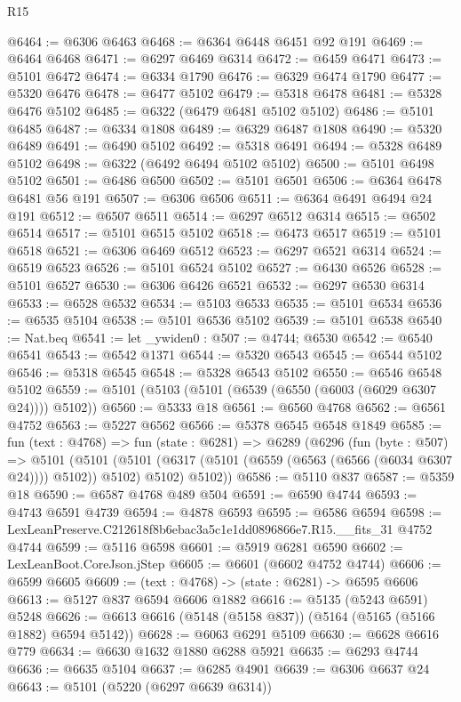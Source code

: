 \begin{lexlean}{R15}
\begin{coremodule}
{{{{{{{{{{{@6464 := @6306 @6463
@6468 := @6364 @6448 @6451 @92 @191
@6469 := @6464 @6468
@6471 := @6297 @6469 @6314
@6472 := @6459 @6471
@6473 := @5101 @6472
@6474 := @6334 @1790
@6476 := @6329 @6474 @1790
@6477 := @5320 @6476
@6478 := @6477 @5102
@6479 := @5318 @6478
@6481 := @5328 @6476 @5102
@6485 := @6322 (@6479 @6481 @5102 @5102)
@6486 := @5101 @6485
@6487 := @6334 @1808
@6489 := @6329 @6487 @1808
@6490 := @5320 @6489
@6491 := @6490 @5102
@6492 := @5318 @6491
@6494 := @5328 @6489 @5102
@6498 := @6322 (@6492 @6494 @5102 @5102)
@6500 := @5101 @6498 @5102
@6501 := @6486 @6500
@6502 := @5101 @6501
@6506 := @6364 @6478 @6481 @56 @191
@6507 := @6306 @6506
@6511 := @6364 @6491 @6494 @24 @191
@6512 := @6507 @6511
@6514 := @6297 @6512 @6314
@6515 := @6502 @6514
@6517 := @5101 @6515 @5102
@6518 := @6473 @6517
@6519 := @5101 @6518
@6521 := @6306 @6469 @6512
@6523 := @6297 @6521 @6314
@6524 := @6519 @6523
@6526 := @5101 @6524 @5102
@6527 := @6430 @6526
@6528 := @5101 @6527
@6530 := @6306 @6426 @6521
@6532 := @6297 @6530 @6314
@6533 := @6528 @6532
@6534 := @5103 @6533
@6535 := @5101 @6534
@6536 := @6535 @5104
@6538 := @5101 @6536 @5102
@6539 := @5101 @6538
@6540 := Nat.beq
@6541 := let _ywiden0 : @507 := @4744; @6530
@6542 := @6540 @6541
@6543 := @6542 @1371
@6544 := @5320 @6543
@6545 := @6544 @5102
@6546 := @5318 @6545
@6548 := @5328 @6543 @5102
@6550 := @6546 @6548 @5102
@6559 := @5101 (@5103 (@5101 (@6539 (@6550 (@6003 (@6029 @6307 @24)))) @5102))
@6560 := @5333 @18
@6561 := @6560 @4768
@6562 := @6561 @4752
@6563 := @5227 @6562
@6566 := @5378 @6545 @6548 @1849
@6585 := fun (text : @4768) =>
  fun (state : @6281) =>
  @6289
    (@6296
      (fun (byte : @507) =>
      @5101
        (@5101 (@5101 (@6317 (@5101 (@6559 (@6563 (@6566 (@6034 @6307 @24)))) @5102)) @5102) @5102)
        @5102))
@6586 := @5110 @837
@6587 := @5359 @18
@6590 := @6587 @4768 @489 @504
@6591 := @6590 @4744
@6593 := @4743 @6591 @4739
@6594 := @4878 @6593
@6595 := @6586 @6594
@6598 := LexLeanPreserve.C212618f8b6ebac3a5c1e1dd0896866e7.R15.__fits_31 @4752 @4744
@6599 := @5116 @6598
@6601 := @5919 @6281 @6590
@6602 := LexLeanBoot.CoreJson.jStep
@6605 := @6601 (@6602 @4752 @4744)
@6606 := @6599 @6605
@6609 := (text : @4768) -> (state : @6281) -> @6595 @6606
@6613 := @5127 @837 @6594 @6606 @1882
@6616 := @5135 (@5243 @6591) @5248
@6626 := @6613 @6616 (@5148 (@5158 @837)) (@5164 (@5165 (@5166 @1882) @6594 @5142))
@6628 := @6063 @6291 @5109
@6630 := @6628 @6616 @779
@6634 := @6630 @1632 @1880 @6288 @5921
@6635 := @6293 @4744
@6636 := @6635 @5104
@6637 := @6285 @4901
@6639 := @6306 @6637 @24
@6643 := @5101 (@5220 (@6297 @6639 @6314))
}}}}}}}}}}}
\end{coremodule}
\end{lexlean}
